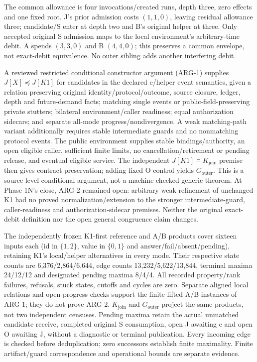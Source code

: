 \documentclass[11pt,a4paper]{article}
\theoremstyle{definition}
\theoremstyle{remark}
\begin{document}
The common allowance is four invocations/created runs, depth three, zero effects and one fixed root. J's prior admission costs $(1,1,0)$, leaving residual allowance three; candidate/S enter at depth two and B's original helper at three. Only accepted original S admission maps to the local environment's arbitrary-time debit. A spends $(3,3,0)$ and B $(4,4,0)$; this preserves a common envelope, not exact-debit equivalence. No outer sibling adds another interfering debit.

A reviewed restricted conditional constructor argument (ARG-1) supplies $J[X]\preceq J[K1]$ for candidates in the declared e/helper event semantics, given a relation preserving original identity/protocol/outcome, source closure, ledger, depth and future-demand facts; matching single events or public-field-preserving private stutters; bilateral environment/caller readiness; equal authorization sidecars; and separate all-mode progress/nondivergence. A weak matching-path variant additionally requires stable intermediate guards and no nonmatching protocol events. The public environment supplies stable bindings/authority, an open eligible caller, sufficient finite limits, no cancellation/retirement or pending release, and eventual eligible service. The independent $J[K1]\models K_{\mathrm{join}}$ premise then gives contract preservation; adding fixed O control yields $G_{\mathrm{outer}}$. This is a source-level conditional argument, not a machine-checked generic theorem. At Phase 1N's close, ARG-2 remained open: arbitrary weak refinement of unchanged K1 had no proved normalization/extension to the stronger intermediate-guard, caller-readiness and authorization-sidecar premises. Neither the original exact-debit definition nor the open general congruence claim changes.

The independently frozen K1-first reference and A/B products cover sixteen inputs each (id in $\{1,2\}$, value in $\{0,1\}$ and answer/fail/absent/pending), retaining K1's local/helper alternatives in every mode. Their respective state counts are 6,376/2,864/6,644, edge counts 13,232/5,622/13,844, terminal maxima 24/12/12 and designated pending maxima 8/4/4. All recorded property/rank failures, refusals, stuck states, cutoffs and cycles are zero. Separate aligned local relations and open-progress checks support the finite lifted A/B instances of ARG-1; they do not prove ARG-2. $K_{\mathrm{join}}$ and $G_{\mathrm{outer}}$ project the same products, not two independent censuses. Pending maxima retain the actual unmatched candidate receive, completed original S consumption, open J awaiting e and open O awaiting J, without a diagnostic or terminal publication. Every incoming edge is checked before deduplication; zero successors establish finite maximality. Finite artifact/guard correspondence and operational bounds are separate evidence.
\end{document}
